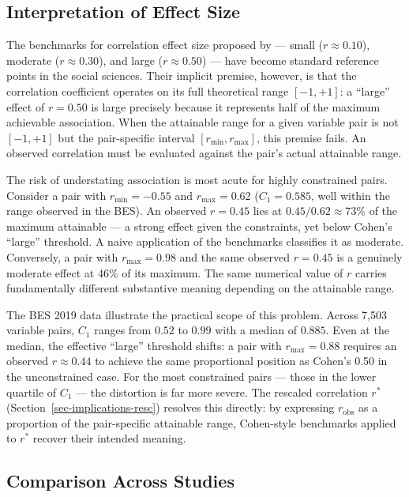 \documentclass[
  12pt,
]{article}
\theoremstyle{plain}
\theoremstyle{definition}
\theoremstyle{remark}
\begin{document}
\subsection{Interpretation of Effect
Size}\label{interpretation-of-effect-size}

The benchmarks for correlation effect size proposed by
\textcite{cohe02-applied} --- small (\(r \approx 0.10\)), moderate
(\(r \approx 0.30\)), and large (\(r \approx 0.50\)) --- have become
standard reference points in the social sciences. Their implicit
premise, however, is that the correlation coefficient operates on its
full theoretical range \([-1, +1]\): a ``large'' effect of \(r = 0.50\)
is large precisely because it represents half of the maximum achievable
association. When the attainable range for a given variable pair is not
\([-1, +1]\) but the pair-specific interval \([r_{\min}, r_{\max}]\),
this premise fails. An observed correlation must be evaluated against
the pair's actual attainable range.

The risk of understating association is most acute for highly
constrained pairs. Consider a pair with \(r_{\min} = -0.55\) and
\(r_{\max} = 0.62\) (\(C_1 = 0.585\), well within the range observed in
the BES). An observed \(r = 0.45\) lies at \(0.45/0.62 \approx 73\%\) of
the maximum attainable --- a strong effect given the constraints, yet
below Cohen's ``large'' threshold. A naive application of the benchmarks
classifies it as moderate. Conversely, a pair with \(r_{\max} = 0.98\)
and the same observed \(r = 0.45\) is a genuinely moderate effect at
46\% of its maximum. The same numerical value of \(r\) carries
fundamentally different substantive meaning depending on the attainable
range.

The BES 2019 data illustrate the practical scope of this problem. Across
7,503 variable pairs, \(C_1\) ranges from \(0.52\) to \(0.99\) with a
median of \(0.885\). Even at the median, the effective ``large''
threshold shifts: a pair with \(r_{\max} = 0.88\) requires an observed
\(r \approx 0.44\) to achieve the same proportional position as Cohen's
0.50 in the unconstrained case. For the most constrained pairs --- those
in the lower quartile of \(C_1\) --- the distortion is far more severe.
The rescaled correlation \(r^*\) (Section~\ref{sec-implications-resc})
resolves this directly: by expressing \(r_{\text{obs}}\) as a proportion
of the pair-specific attainable range, Cohen-style benchmarks applied to
\(r^*\) recover their intended meaning.

\subsection{Comparison Across Studies}\label{comparison-across-studies}
\end{document}

